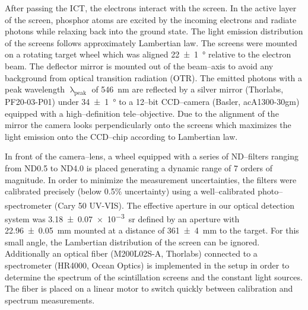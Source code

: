 \documentclass[%
reprint,
amsmath,
amssymb,
aip,
rsi, 
numerical,
floatfix,
]{revtex4-1}
\newcommand{\myCite}[1]{\textcolor{blue}{\cite{#1}}}
\begin{document}
After passing the ICT, the electrons interact with the screen. 
In the active layer of the screen, phosphor atoms are excited by the incoming electrons and radiate photons while relaxing back into the ground state.
The light emission distribution of the screens follows approximately Lambertian law\myCite{Giakoumakis1985}. 
The screens were mounted on a rotating target wheel which was aligned \SI[separate-uncertainty = true]{22(1)}{\degree} relative to the electron beam.
The deflector mirror is mounted out of the beam--axis to avoid any background from optical transition radiation (OTR).  
The emitted photons with a peak wavelength $\uplambda_{\text{peak}}$ of \SI{546}{\nano\metre} are reflected by a silver mirror (Thorlabs, PF20-03-P01) under \SI[separate-uncertainty = true]{34(1)}{\degree} to a 12--bit CCD--camera (Basler, acA1300-30gm) equipped with a high--definition tele--objective. 
Due to the alignment of the mirror the camera looks perpendicularly onto the screens which maximizes the light emission onto the CCD--chip according to Lambertian law.
 
In front of the camera--lens, a wheel equipped with a series of ND--filters ranging from ND0.5 to ND4.0 is placed generating a dynamic range of 7 orders of magnitude. 
In order to minimize the measurement uncertainties, the filters were calibrated precisely (below 0.5$\%$ uncertainty) using a well--calibrated photo--spectrometer (Cary\textsuperscript{\textregistered} 50 UV-VIS).
The effective aperture in our optical detection system was \SI[separate-uncertainty = true]{3.18(7)e-3}{\steradian} defined by an aperture with \SI[separate-uncertainty = true]{22.96(5)}{\milli\metre} mounted at a distance of \SI[separate-uncertainty = true]{361(4)}{\milli\metre} to the target.
For this small angle, the Lambertian distribution of the screen can be ignored.
Additionally an optical fiber (M200L02S-A, Thorlabs) connected to a spectrometer (HR4000, Ocean Optics) is implemented in the setup in order to determine the spectrum of the scintillation screens and the constant light sources.
The fiber is placed on a linear motor to switch quickly between calibration and spectrum measurements. 
 
\end{document}

